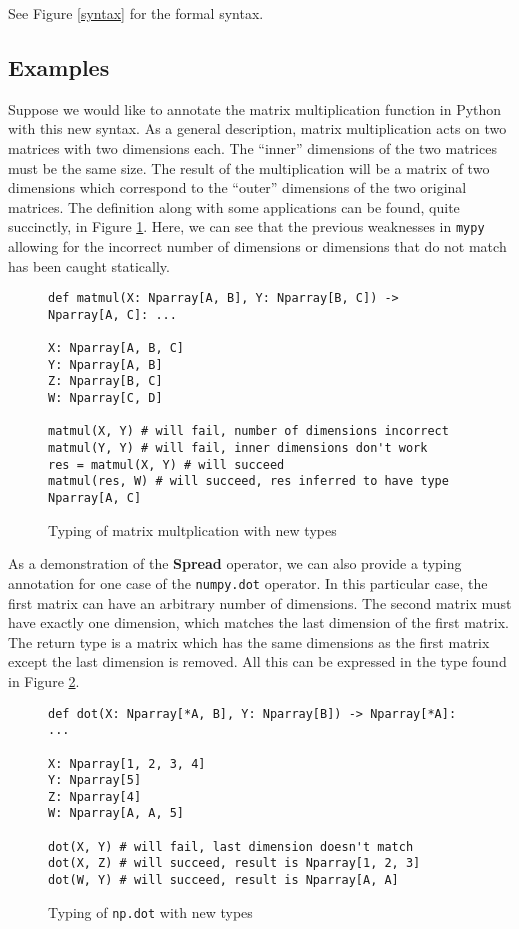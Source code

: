 \documentclass{article}
\begin{document}
See Figure \ref{syntax} for the formal syntax.

\subsection{Examples}

Suppose we would like to annotate the matrix multiplication function in Python with this new syntax. As a general description, matrix multiplication acts on two matrices with two dimensions each. The ``inner'' dimensions of the two matrices must be the same size. The result of the multiplication will be a matrix of two dimensions which correspond to the ``outer'' dimensions of the two original matrices. The definition along with some applications can be found, quite succinctly, in Figure \ref{np-type-matmul}. Here, we can see that the previous weaknesses in \texttt{mypy} allowing for the incorrect number of dimensions or dimensions that do not match has been caught statically.

\begin{figure}
    \centering
    \begin{verbatim}
def matmul(X: Nparray[A, B], Y: Nparray[B, C]) -> Nparray[A, C]: ...

X: Nparray[A, B, C]
Y: Nparray[A, B]
Z: Nparray[B, C]
W: Nparray[C, D]

matmul(X, Y) # will fail, number of dimensions incorrect
matmul(Y, Y) # will fail, inner dimensions don't work
res = matmul(X, Y) # will succeed
matmul(res, W) # will succeed, res inferred to have type Nparray[A, C]\end{verbatim}
    \caption{Typing of matrix multplication with new types}
    \label{np-type-matmul}
\end{figure}

As a demonstration of the \textbf{Spread} operator, we can also provide a typing annotation for one case of the \texttt{numpy.dot} operator. In this particular case, the first matrix can have an arbitrary number of dimensions. The second matrix must have exactly one dimension, which matches the last dimension of the first matrix. The return type is a matrix which has the same dimensions as the first matrix except the last dimension is removed. All this can be expressed in the type found in Figure \ref{np-type-dot}.

\begin{figure}
    \begin{verbatim}
def dot(X: Nparray[*A, B], Y: Nparray[B]) -> Nparray[*A]: ...

X: Nparray[1, 2, 3, 4]
Y: Nparray[5]
Z: Nparray[4]
W: Nparray[A, A, 5]

dot(X, Y) # will fail, last dimension doesn't match
dot(X, Z) # will succeed, result is Nparray[1, 2, 3]
dot(W, Y) # will succeed, result is Nparray[A, A]\end{verbatim}
    \caption{Typing of \texttt{np.dot} with new types}
    \label{np-type-dot}
\end{figure}
\end{document}
